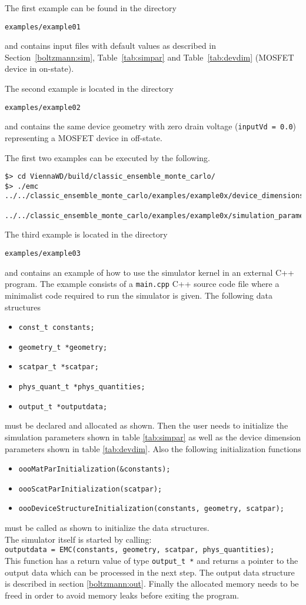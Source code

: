 The first example can be found in the directory

\texttt{examples/example01}

and contains input files with default values as described in Section~\ref{boltzmann:sim},
Table~\ref{tab:simpar} and Table~\ref{tab:devdim} (MOSFET device in on-state).

The second example is located in the directory

\texttt{examples/example02}

and contains the same device geometry with zero drain voltage (\texttt{inputVd = 0.0}) representing a MOSFET device in off-state.


The first two examples can be executed by the following.
\begin{lstlisting}
$> cd ViennaWD/build/classic_ensemble_monte_carlo/
$> ./emc ../../classic_ensemble_monte_carlo/examples/example0x/device_dimensions.in
     ../../classic_ensemble_monte_carlo/examples/example0x/simulation_parameters.in
\end{lstlisting}

The third example is located in the directory

\texttt{examples/example03}

and contains an example of how to use the simulator kernel in an external C++ program. The example consists of a \texttt{main.cpp} C++ source code file where a minimalist code required to run the simulator is given.
The following data structures
\begin{itemize}
\item \texttt{const\_t constants;}
\item \texttt{geometry\_t *geometry;}
\item \texttt{scatpar\_t *scatpar;}
\item \texttt{phys\_quant\_t *phys\_quantities;}
\item \texttt{output\_t *outputdata;}
\end{itemize}
must be declared and allocated as shown. Then the user needs to initialize the simulation parameters shown in table \ref{tab:simpar} as well as the device dimension parameters shown in table \ref{tab:devdim}. Also the following initialization functions
\begin{itemize}
\item \texttt{oooMatParInitialization(\&constants);}
\item \texttt{oooScatParInitialization(scatpar);}
\item \texttt{oooDeviceStructureInitialization(constants, geometry, scatpar);}
\end{itemize}
must be called as shown to initialize the data structures. \\
The simulator itself is started by calling: \\
\texttt{outputdata = EMC(constants, geometry, scatpar, phys\_quantities);} \\
This function has a return value of type \texttt{output\_t *} and returns a pointer to the output data which can be processed in the next step. The output data structure is described in section \ref{boltzmann:out}. Finally the allocated memory needs to be freed in order to avoid memory leaks before exiting the program.


